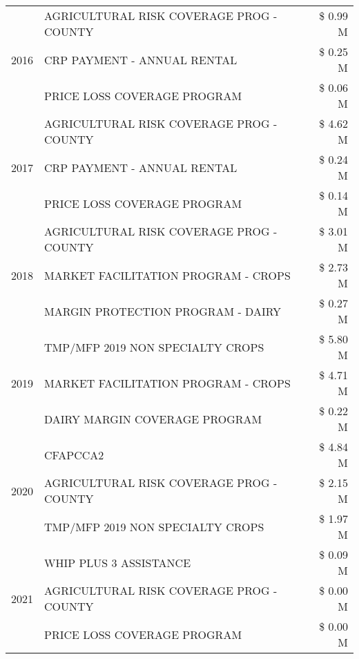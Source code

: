 \begin{tabular}{llr}
\cline{1-3}
\multirow[t]{3}{*}{2016} & AGRICULTURAL RISK COVERAGE PROG - COUNTY & \$ 0.99 M \\
 & CRP PAYMENT - ANNUAL RENTAL & \$ 0.25 M \\
 & PRICE LOSS COVERAGE PROGRAM & \$ 0.06 M \\
\cline{1-3}
\multirow[t]{3}{*}{2017} & AGRICULTURAL RISK COVERAGE PROG - COUNTY & \$ 4.62 M \\
 & CRP PAYMENT - ANNUAL RENTAL & \$ 0.24 M \\
 & PRICE LOSS COVERAGE PROGRAM & \$ 0.14 M \\
\cline{1-3}
\multirow[t]{3}{*}{2018} & AGRICULTURAL RISK COVERAGE PROG - COUNTY & \$ 3.01 M \\
 & MARKET FACILITATION PROGRAM - CROPS & \$ 2.73 M \\
 & MARGIN PROTECTION PROGRAM - DAIRY & \$ 0.27 M \\
\cline{1-3}
\multirow[t]{3}{*}{2019} & TMP/MFP 2019 NON SPECIALTY CROPS & \$ 5.80 M \\
 & MARKET FACILITATION PROGRAM - CROPS & \$ 4.71 M \\
 & DAIRY MARGIN COVERAGE PROGRAM & \$ 0.22 M \\
\cline{1-3}
\multirow[t]{3}{*}{2020} & CFAPCCA2 & \$ 4.84 M \\
 & AGRICULTURAL RISK COVERAGE PROG - COUNTY & \$ 2.15 M \\
 & TMP/MFP 2019 NON SPECIALTY CROPS & \$ 1.97 M \\
\cline{1-3}
\multirow[t]{3}{*}{2021} & WHIP PLUS 3 ASSISTANCE & \$ 0.09 M \\
 & AGRICULTURAL RISK COVERAGE PROG - COUNTY & \$ 0.00 M \\
 & PRICE LOSS COVERAGE PROGRAM & \$ 0.00 M \\
\cline{1-3}
\bottomrule
\end{tabular}
